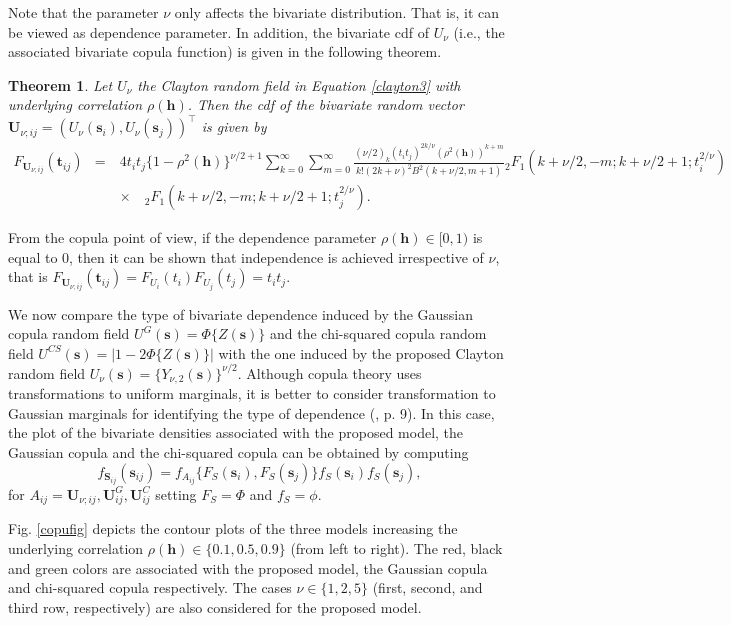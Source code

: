 \documentclass[times,sort&compress,3p]{elsarticle}
\theoremstyle{plain}%
\newtheorem{theorem}{Theorem}
\theoremstyle{definition}
\def\ss{\bm{s}}
\def\SS{\bm{S}}
\def\UU{\bm{U}}
\def\hh{\bm{h}}
\begin{document}
Note that the parameter $\nu$ only affects the bivariate distribution. That is, it can be viewed as dependence parameter. In addition, the bivariate cdf of $U_{\nu}$ (i.e.,  the associated bivariate copula function) is given in the following theorem.
\begin{theorem}\label{theo3}
Let $U_{\nu}$ the Clayton  random field in Equation \eqref{clayton3} with underlying correlation $\rho(\hh)$. Then the cdf of the bivariate random vector $\UU_{\nu;ij}=(U_{\nu}(\ss_i),U_{\nu}(\ss_j))^\top$
is given by
\begin{eqnarray}\label{copu}
F_{\UU_{\nu;ij}}(\bm{t}_{ij})&=&
4t_i t_j\{1-\rho^2(\hh)\}^{\nu/2+1}
\sum\limits_{k=0}^{\infty}\sum\limits_{m=0}^{\infty}\frac{\left(\nu/2\right)_k(t_it_j)^{2k/\nu}(\rho^{2}(\hh))^{k+m} }{k!(2k+\nu)^2 B^2\left(k+\nu/2,m+1\right)}%
{}_2F_1\left(k+\nu/2,-m;k+\nu/2+1;t^{2/\nu}_i\right)\nonumber\\
&\quad&\times\quad
{}_2F_1\left(k+\nu/2,-m;k+\nu/2+1;t^{2/\nu}_j\right).
\end{eqnarray}
\end{theorem}

From the copula point of view, if the dependence parameter $\rho(\hh)\in[0,1)$ is equal to $0$, then it can be shown that independence is achieved irrespective of $\nu$, that  is $F_{\UU_{\nu;ij}}(\bm{t}_{ij})=F_{U_{i}}(t_i)F_{U_{j}}(t_j)=t_i t_j$.

We now compare the type of bivariate dependence induced by the Gaussian copula random field
$U^G(\ss)=\Phi\{Z(\ss)\}$
 and the chi-squared copula
random field    $U^{CS}(\ss)=|1-2\Phi\{Z(\ss)\}|$ \citep{QUESSY201640} with  the one induced by  the proposed  Clayton random field
$U_{\nu}(\ss) =\{Y_{\nu,2}(\ss)\}^{\nu/2}$.
 Although copula theory uses transformations to uniform marginals, it is better to consider transformation to Gaussian marginals for identifying the type of dependence (\cite{Joe:2014}, p. 9). In this case, the plot of  the bivariate  densities
associated with  the proposed model, the Gaussian copula and the chi-squared copula
can be obtained by computing
\begin{equation}\label{pairkUU}
f_{\SS_{ij}}(\ss_{ij})=
f_{A_{ij}}\{F_S(\ss_i),F_S(\ss_j)\}f_S(\ss_i)f_S(\ss_j),
\end{equation}
for $A_{ij}=\UU_{\nu;ij}, \UU^G_{ij}, \UU^C_{ij}$
setting  $F_S=\Phi$ and $f_S=\phi$.

 Fig. \ref{copufig} depicts the contour plots of the  three models increasing the underlying correlation $\rho(\hh)\in\{0.1, 0.5, 0.9\}$ (from left to right). The red, black  and  green colors
 are associated with  the  proposed model, the Gaussian copula and chi-squared copula respectively.
 The cases $\nu\in\{1, 2, 5\}$ (first, second, and third row, respectively) are also considered for the proposed model.
\end{document}
